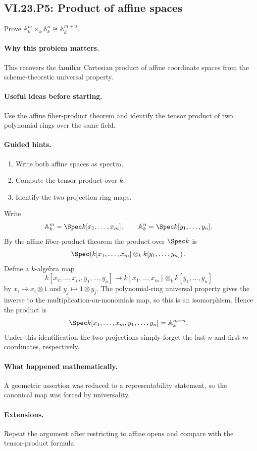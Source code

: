 \subsection*{VI.23.P5: Product of affine spaces}
\begin{problem}\label{prob:vi23-p05}
Prove $\mathbb A^m_k\times_k\mathbb A^n_k\cong\mathbb A^{m+n}_k$.
\end{problem}

\ifdefined\FullProblemDossiers
\paragraph{Why this problem matters.}
This recovers the familiar Cartesian product of affine coordinate spaces from the scheme-theoretic universal property.

\paragraph{Useful ideas before starting.}
Use the affine fiber-product theorem and identify the tensor product of two polynomial rings over the same field.

\paragraph{Guided hints.}
\begin{enumerate}
\item Write both affine spaces as spectra.
\item Compute the tensor product over $k$.
\item Identify the two projection ring maps.
\end{enumerate}

\begin{solution}
Write
\[
\mathbb A^m_k=\Spec k[x_1,\dots,x_m],\qquad
\mathbb A^n_k=\Spec k[y_1,\dots,y_n].
\]
By the affine fiber-product theorem the product over $\Spec k$ is
\[
\Spec\!\left(k[x_1,\dots,x_m]\otimes_k k[y_1,\dots,y_n]\right).
\]
Define a $k$-algebra map
\[
k[x_1,\dots,x_m,y_1,\dots,y_n]
\to
k[x_1,\dots,x_m]\otimes_k k[y_1,\dots,y_n]
\]
by $x_i\mapsto x_i\otimes1$ and $y_j\mapsto1\otimes y_j$.  The polynomial-ring universal
property gives the inverse to the multiplication-on-monomials map, so this is an isomorphism.
Hence the product is
\[
\Spec k[x_1,\dots,x_m,y_1,\dots,y_n]=\mathbb A^{m+n}_k.
\]
Under this identification the two projections simply forget the last $n$ and first $m$
coordinates, respectively.
\end{solution}

\paragraph{What happened mathematically.}
A geometric assertion was reduced to a representability statement, so the canonical map was forced by universality.

\paragraph{Extensions.}
Repeat the argument after restricting to affine opens and compare with the tensor-product formula.
\fi
